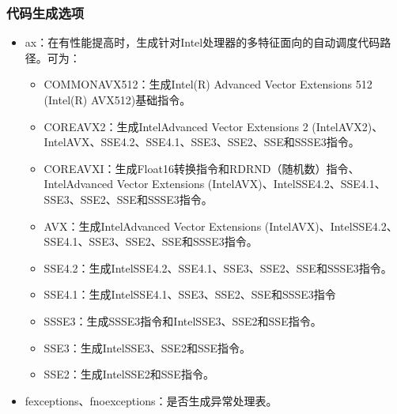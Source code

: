 \documentclass[a4paper,12pt,english]{sphinxmanual}
\begin{document}
\subsubsection{代码生成选项}
\label{\detokenize{compiler/intel:id4}}\begin{itemize}
\item {} 
\sphinxAtStartPar
\sphinxhyphen{}ax：在有性能提高时，生成针对Intel处理器的多特征面向的自动调度代码路径。可为：
\begin{itemize}
\item {} 
\sphinxAtStartPar
COMMON\sphinxhyphen{}AVX512：生成Intel(R) Advanced Vector Extensions 512 (Intel(R) AVX\sphinxhyphen{}512)基础指令。

\item {} 
\sphinxAtStartPar
CORE\sphinxhyphen{}AVX2：生成IntelAdvanced Vector Extensions 2 (IntelAVX2)、IntelAVX、SSE4.2、SSE4.1、SSE3、SSE2、SSE和SSSE3指令。

\item {} 
\sphinxAtStartPar
CORE\sphinxhyphen{}AVX\sphinxhyphen{}I：生成Float\sphinxhyphen{}16转换指令和RDRND（随机数）指令、IntelAdvanced Vector Extensions (IntelAVX)、IntelSSE4.2、SSE4.1、SSE3、SSE2、SSE和SSSE3指令。

\item {} 
\sphinxAtStartPar
AVX：生成IntelAdvanced Vector Extensions (IntelAVX)、IntelSSE4.2、SSE4.1、SSE3、SSE2、SSE和SSSE3指令。

\item {} 
\sphinxAtStartPar
SSE4.2：生成IntelSSE4.2、SSE4.1、SSE3、SSE2、SSE和SSSE3指令。

\item {} 
\sphinxAtStartPar
SSE4.1：生成IntelSSE4.1、SSE3、SSE2、SSE和SSSE3指令

\item {} 
\sphinxAtStartPar
SSSE3：生成SSSE3指令和IntelSSE3、SSE2和SSE指令。

\item {} 
\sphinxAtStartPar
SSE3：生成IntelSSE3、SSE2和SSE指令。

\item {} 
\sphinxAtStartPar
SSE2：生成IntelSSE2和SSE指令。

\end{itemize}

\item {} 
\sphinxAtStartPar
\sphinxhyphen{}fexceptions、\sphinxhyphen{}fno\sphinxhyphen{}exceptions：是否生成异常处理表。


\end{itemize}
\end{document}
